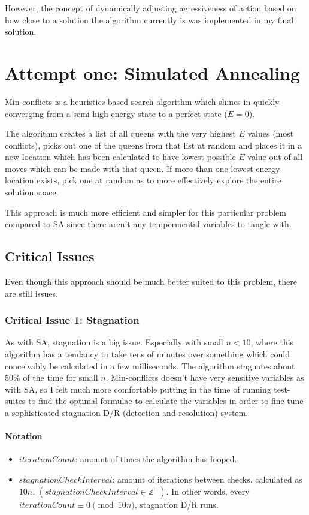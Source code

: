 \documentclass{article}
\begin{document}
However, the concept of dynamically adjusting agressiveness of action based on how close
to a solution the algorithm currently is was implemented in my final solution.

\section{Attempt one: Simulated Annealing}
\href{https://en.wikipedia.org/wiki/Min-conflicts_algorithm}{Min-conflicts}
is a heuristics-based search algorithm which shines in quickly converging from a semi-high energy state to a perfect state (\(E = 0\)).

The algorithm creates a list of all queens with the very highest \(E\) values (most conflicts),
picks out one of the queens from that list at random and places it in a new location
which has been calculated to have lowest possible \(E\) value out of all moves which can be made with that queen.
If more than one lowest energy location exists, pick one at random as to more effectively explore the entire solution space.

This approach is much more efficient and simpler for this particular problem compared to SA since there aren't any tempermental variables to tangle with.

\subsection{Critical Issues}
Even though this approach should be much better suited to this problem, there are still issues.
\subsubsection{Critical Issue 1: Stagnation}
As with SA, stagnation is a big issue. Especially with small \(n<10\), where this algorithm has a tendancy to take tens of minutes over something which could conceivably be calculated in a few milliseconds.
The algorithm stagnates about 50\% of the time for small \(n\).
Min-conflicts doesn't have very sensitive variables as with SA,
so I felt much more comfortable putting in the time of running test-suites to find the optimal formulae to calculate the variables in order to fine-tune a sophisticated stagnation D/R (detection and resolution) system.

\paragraph{Notation}
\begin{itemize}

    \item \(iterationCount\): amount of times the algorithm has looped.
    \item \(stagnationCheckInterval\): amount of iterations between checks, calculated as \(10n\).
          \((stagnationCheckInterval \in \mathbb{Z}^+)\). In other words, every \(iterationCount \equiv 0 \pmod{10n}\), stagnation D/R runs.
\end{itemize}
\end{document}
